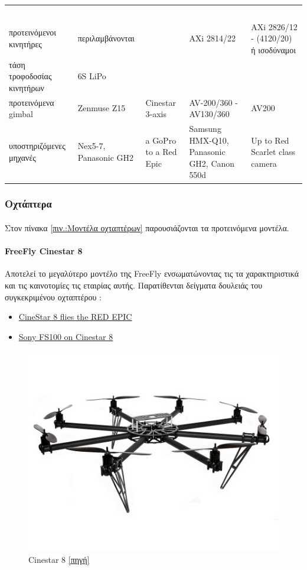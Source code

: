 \documentclass[a4paper, 12pt, twoside]{report}
\begin{document}
{{{{{{\begin{landscape}
\begin{longtable} { m{3cm} m{3.5cm} m{3.5cm} m{3.5cm} m{3.5cm} }
					~\\
					προτεινόμενοι κινητήρες & περιλαμβάνονται & & AXi 2814/22 & AXi 2826/12 - (4120/20) ή ισοδύναμοι\\
					τάση τροφοδοσίας κινητήρων & 6S LiPo & & & \\
					προτεινόμενα gimbal & Zenmuse Z15 & Cinestar 3-axis & AV-200/360 - AV130/360 & AV200\\
					υποστηριζόμενες μηχανές  & Nex5-7, Panasonic GH2 & a GoPro to a Red Epic & Samsung HMX-Q10, Panasonic GH2, Canon 550d & Up to Red Scarlet class camera\\
					\hline
				\end{longtable}
				\end{landscape}
			
		\subsubsection{Οχτάπτερα}

			\paragraph{}{Στον πίνακα \ref{πιν.:Μοντέλα οχταπτέρων} παρουσιάζονται τα προτεινόμενα μοντέλα.
			}
			\paragraph{FreeFly Cinestar 8}{Αποτελεί το μεγαλύτερο μοντέλο της FreeFly ενσωματώνοντας τις τα χαρακτηριστικά και τις καινοτομίες τις εταιρίας αυτής. Παρατίθενται δείγματα δουλειάς του συγκεκριμένου οχταπτέρου :
				\begin{itemize}
					\item \href{https://vimeo.com/28738207}{CineStar 8 flies the RED EPIC}
					\item \href{https://vimeo.com/29000807}{Sony FS100 on Cinestar 8}
				\end{itemize}
			}
			\begin{figure}[hp]
					\centering
					\includegraphics[scale=0.50]{cinestar_8.png}
					\caption{Cinestar 8 \href{http://www.quadrocopter.us/ready-to-fly/}{[πηγή]}}
					\label{φωτ:Cinestar 8}
			\end{figure}
			
}}}}}}
\end{document}

